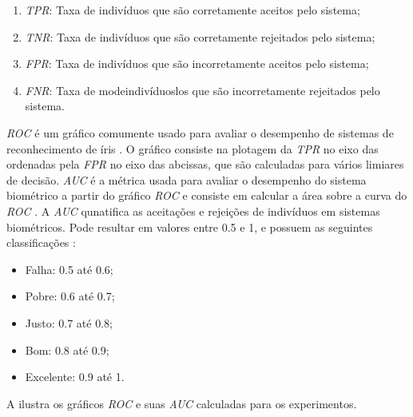 \begin{enumerate}
    \item \textit{\acrfull{TPR}}: Taxa de indivíduos que são corretamente aceitos pelo sistema;
    \item \textit{\acrfull{TNR}}: Taxa de indivíduos que são corretamente rejeitados pelo sistema;
    \item \textit{\acrfull{FPR}}: Taxa de indivíduos que são incorretamente aceitos pelo sistema;
    \item \textit{\acrfull{FNR}}: Taxa de modeindivíduoslos que são incorretamente rejeitados pelo sistema.
\end{enumerate}

\par \textit{\acrshort{ROC}} é um gráfico comumente usado para avaliar o desempenho de sistemas de reconhecimento de íris \cite{aucROC, daugman2000}. O gráfico consiste na plotagem da \textit{\acrshort{TPR}} no eixo das ordenadas pela \textit{\acrshort{FPR}} no eixo das abcissas, que são calculadas para vários limiares de decisão. \textit{\acrshort{AUC}} é a métrica usada para avaliar o desempenho do sistema biométrico a partir do gráfico \textit{\acrshort{ROC}} e consiste em calcular a área sobre a curva do \textit{\acrshort{ROC}} \cite{aucROC}. A \textit{\acrshort{AUC}} qunatifica as aceitações e rejeições de indivíduos em sistemas biométricos. Pode resultar em valores entre 0.5 e 1, e possuem as seguintes classificações \cite{aucROC}:

\begin{itemize}
    \item Falha: 0.5 até 0.6;
    \item Pobre: 0.6 até 0.7;
    \item Justo: 0.7 até 0.8;
    \item Bom: 0.8 até 0.9;
    \item Excelente: 0.9 até 1.
\end{itemize}

A  ilustra os gráficos \textit{\acrshort{ROC}} e suas \textit{\acrshort{AUC}} calculadas para os experimentos.

